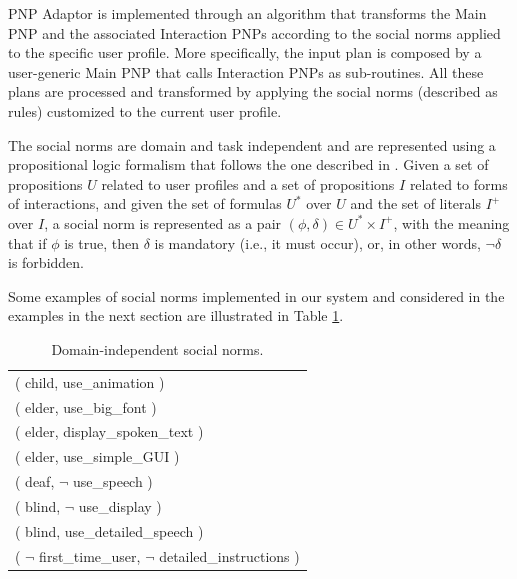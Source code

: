 PNP Adaptor is implemented through an algorithm that transforms the Main PNP and the associated Interaction PNPs according to the social norms applied to the specific user profile. More specifically, the input plan is composed by a user-generic Main PNP that calls Interaction PNPs as sub-routines. All these plans are processed and transformed by applying the social norms (described as rules) customized to the current user profile.

The social norms are domain and task independent and are represented using a propositional logic formalism that follows the one described in \cite{BoPiTo09}. 
Given a set of propositions $U$ related to user profiles and a set of propositions $I$ related to forms of interactions, and given the set of formulas $U^{*}$ over $U$ and the set of literals $I^{+}$ over $I$,
a social norm is represented as a pair $(\phi,\delta) \in U^{*} \times I^{+}$, %
with the meaning that if $\phi$ is true, then $\delta$ is mandatory (i.e., it must occur), or, in other words, $\neg \delta$ is forbidden. 

Some examples of social norms implemented in our system and considered in the examples in the next section are illustrated in Table \ref{tab:socialnorms}. 


\begin{table}
\begin{center}
\begin{tabular}{|l|} \hline
( child, use\_animation ) \\ 
( elder, use\_big\_font ) \\ 
( elder, display\_spoken\_text ) \\ 
( elder, use\_simple\_GUI ) \\
( deaf, $\neg$ use\_speech ) \\
( blind, $\neg$ use\_display ) \\
( blind, use\_detailed\_speech ) \\
( $\neg$ first\_time\_user, $\neg$ detailed\_instructions ) \\ 
\hline
\end{tabular}
\caption{Domain-independent social norms.}
\label{tab:socialnorms}
\end{center}
\vspace{-0.8cm}
\end{table}

